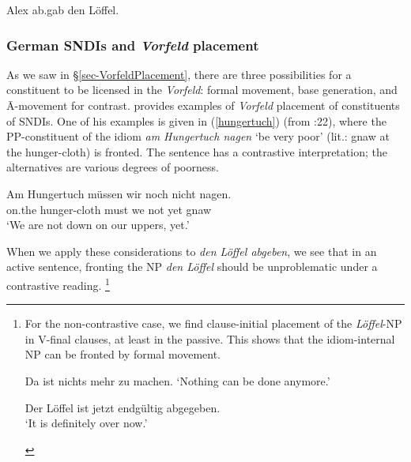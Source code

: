 \documentclass[output=paper]{langsci/langscibook}
\begin{document}
\begin{exe}
\ex\label{v2-loeffel}
\begin{xlist}
\ex *Alex ab.gab den L\"offel.\label{v2-loeffel-abgab}
\end{xlist}
\end{exe}


\subsubsection{German SNDIs and \textit{Vorfeld} placement}

As we saw in §\ref{sec-VorfeldPlacement}, there are three possibilities for a constituent to be licensed in the \textit{Vorfeld}: formal movement, base generation, and Ā-movement for contrast. \cite{Fanselow:04} provides examples of \emph{Vorfeld} placement of constituents of SNDIs. One of his examples is given in (\ref{hungertuch}) (from \citeauthor{Fanselow:04} \citeyear{Fanselow:04}:22), where the PP-constituent of the idiom \textit{am Hungertuch nagen} `be very poor' (lit.: gnaw at the hunger-cloth) is fronted. The sentence has a contrastive interpretation; the alternatives are various degrees of poorness.

\ea
\gll Am Hungertuch m\"ussen wir noch nicht nagen.\\
on.the hunger-cloth must we not yet gnaw\\
\glt `We are not down on our uppers, yet.'\label{hungertuch}
\z

When we apply these considerations to \textit{den L\"offel abgeben}, we see that in an active sentence, fronting the NP \textit{den L\"offel} should be unproblematic under a contrastive reading.%
\footnote{For the non-contrastive case, we find clause-initial placement of the \textit{L\"offel}-NP in V-final clauses, at least in the  passive. This shows that the idiom-internal NP can be fronted by formal movement.

\begin{exe}
\ex \label{zu machen}
Da ist nichts mehr zu machen. \textnormal{`Nothing can be done anymore.'}
\begin{xlist}
\ex
 Der L\"offel ist jetzt endg\"ultig abgegeben.\\
\textnormal{`It is definitely over now.'}
\end{xlist}
\end{exe}
}
\end{document}
